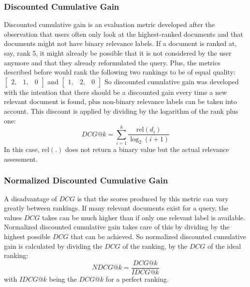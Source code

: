 \subsubsection{Discounted Cumulative Gain}
Discounted cumulative gain is an evaluation metric developed after the observation that users often only look at the highest-ranked documents and that documents might not have binary relevance labels.
If a document is ranked at, say, rank 5, it might already be possible that it is not considered by the user anymore and that they already reformulated the query. Plus, the metrics described before would rank the following two rankings to be of equal quality: 
$\left[
\begin{smallmatrix}
	2, & 1, & 0
\end{smallmatrix}
\right]$ and $\left[
\begin{smallmatrix}
	1, & 2, & 0
\end{smallmatrix}
\right]$
So discounted cumulative gain was developed with the intention that there should be a discounted gain every time a new relevant document is found, plus non-binary relevance labels can be taken into account. This discount is applied by dividing by the logarithm of the rank plus one: 
\begin{equation}
	\textit{DCG}@k = \sum^k_{i=1} \frac{\text{rel}(d_i)}{\log_2(i+1)}
\end{equation}
In this case, $\text{rel}(.)$ does not return a binary value but the actual relevance assessment.

\subsubsection{Normalized Discounted Cumulative Gain}
A disadvantage of $\textit{DCG}$ is that the scores produced by this metric can vary greatly between rankings. If many relevant documents exist for a query, the values $\textit{DCG}$ takes can be much higher than if only one relevant label is available. Normalized discounted cumulative gain takes care of this by dividing by the highest possible $\textit{DCG}$ that can be achieved. So normalized discounted cumulative gain is calculated by dividing the $\textit{DCG}$ of the ranking, by the $\textit{DCG}$ of the ideal ranking:  
\begin{equation}
	\textit{NDCG}@k = \frac{\textit{DCG}@k}{\textit{IDCG}@k} 
\end{equation}
with $\textit{IDCG}@k$ being the $\textit{DCG}@k$ for a perfect ranking. 

